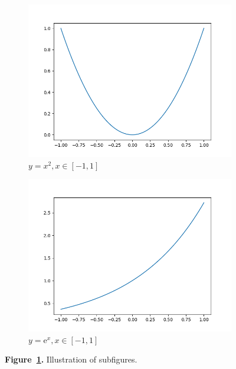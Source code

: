 \documentclass{article}
\begin{document}
\begin{figure}
\begin{subfigure}{0.3\linewidth}
        \includegraphics[width=\linewidth]{../figures/square.png}
        \caption{\(y=x^2, x\in[-1,1]\)}
    \end{subfigure}
    \begin{subfigure}{0.3\linewidth}
        \includegraphics[width=\linewidth]{../figures/exp.png}
        \caption{\(y=\mathrm{e}^x, x\in[-1,1]\)}
    \end{subfigure}
    \caption{\textbf{Figure~\ref{Figure-Subfigures}.} Illustration of subfigures.}\label{Figure-Subfigures}
\end{figure}
\end{document}
